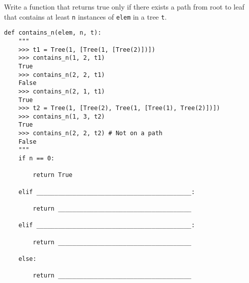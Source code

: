 \begin{blocksection}
\question Write a function that returns true only if there exists a path from root to leaf that contains at least \lstinline$n$ instances of \lstinline$elem$ in a tree \lstinline$t$.

\begin{lstlisting}
def contains_n(elem, n, t):
    """
    >>> t1 = Tree(1, [Tree(1, [Tree(2)])])
    >>> contains_n(1, 2, t1)
    True
    >>> contains_n(2, 2, t1)
    False
    >>> contains_n(2, 1, t1)
    True
    >>> t2 = Tree(1, [Tree(2), Tree(1, [Tree(1), Tree(2)])])
    >>> contains_n(1, 3, t2)
    True
    >>> contains_n(2, 2, t2) # Not on a path
    False
    """
    if n == 0:
		
        return True
				
    elif ___________________________________________:
		
        return _____________________________________
				
    elif ___________________________________________:
		
        return _____________________________________
				
    else:
    
        return _____________________________________
\end{lstlisting}
\end{blocksection}

